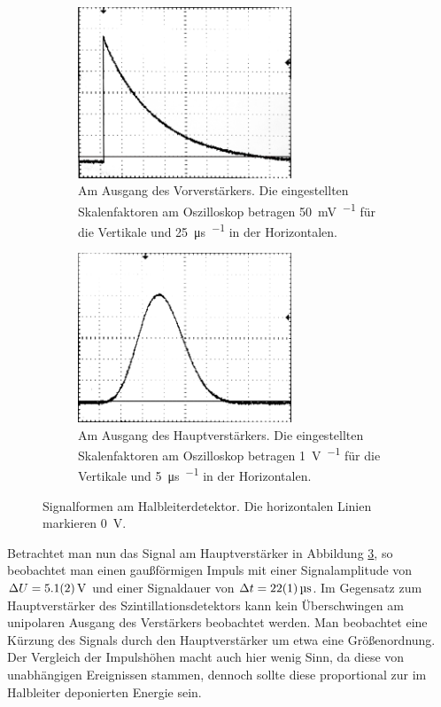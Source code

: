 \documentclass[11pt, a4paper]{article}
\numberwithin{equation}{section}
\begin{document}
\begin{figure}[ht]
	\centering
	\begin{subfigure}[b]{0.7\textwidth}
		\centering
		\includegraphics[width=0.7\textwidth]{./figures/signale/vor_ger_abgeschnitten.jpg}
		\caption{Am Ausgang des Vorverstärkers. Die eingestellten Skalenfaktoren am Oszilloskop betragen \SI{50}{\milli\volt\per\division} für die Vertikale und \SI{25}{\micro\second\per\division} in der Horizontalen.}
		\label{fig:signal_ger_vor}
	\end{subfigure}

	\begin{subfigure}[b]{0.7\textwidth}
		\centering
		\includegraphics[width=0.7\textwidth]{./figures/signale/haupt_ger_abgeschnitten.jpg}
		\caption{Am Ausgang des Hauptverstärkers. Die eingestellten Skalenfaktoren am Oszilloskop betragen \SI{1}{\volt\per\division} für die Vertikale und \SI{5}{\micro\second\per\division} in der Horizontalen.}
		\label{fig:signal_ger_haupt}
	\end{subfigure}
	\caption{Signalformen am Halbleiterdetektor. Die horizontalen Linien markieren \SI{0}{\volt}.}
\end{figure}
Betrachtet man nun das Signal am Hauptverstärker in Abbildung \ref{fig:signal_ger_haupt}, so beobachtet man einen gaußförmigen Impuls mit einer Signalamplitude von $\Delta U = \SI{5.1 +- 0.2}{\volt}$ und einer Signaldauer von $\Delta t = \SI{22 +- 1}{\micro\second}$.
Im Gegensatz zum Hauptverstärker des Szintillationsdetektors kann kein Überschwingen am unipolaren Ausgang des Verstärkers beobachtet werden.
Man beobachtet eine Kürzung des Signals durch den Hauptverstärker um etwa eine Größenordnung.
Der Vergleich der Impulshöhen macht auch hier wenig Sinn, da diese von unabhängigen Ereignissen stammen, dennoch sollte diese proportional zur im Halbleiter deponierten Energie sein.
\end{document}
